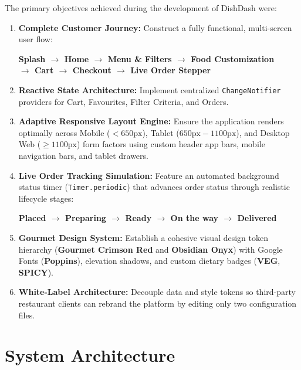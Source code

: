\documentclass[11pt,a4paper]{article}
\begin{document}
The primary objectives achieved during the development of DishDash were:
\begin{enumerate}[leftmargin=*]
    \item \textbf{Complete Customer Journey:} Construct a fully functional, multi-screen user flow: 
    \begin{center}
    \small\bfseries
    Splash $\longrightarrow$ Home $\longrightarrow$ Menu \& Filters $\longrightarrow$ Food Customization \\
    $\longrightarrow$ Cart $\longrightarrow$ Checkout $\longrightarrow$ Live Order Stepper
    \end{center}
    \item \textbf{Reactive State Architecture:} Implement centralized \texttt{ChangeNotifier} providers for Cart, Favourites, Filter Criteria, and Orders.
    \item \textbf{Adaptive Responsive Layout Engine:} Ensure the application renders optimally across Mobile ($<650\text{px}$), Tablet ($650\text{px} - 1100\text{px}$), and Desktop Web ($\ge 1100\text{px}$) form factors using custom header app bars, mobile navigation bars, and tablet drawers.
    \item \textbf{Live Order Tracking Simulation:} Feature an automated background status timer (\texttt{Timer.periodic}) that advances order status through realistic lifecycle stages:
    \begin{center}
    \small\bfseries
    Placed $\longrightarrow$ Preparing $\longrightarrow$ Ready $\longrightarrow$ On the way $\longrightarrow$ Delivered
    \end{center}
    \item \textbf{Gourmet Design System:} Establish a cohesive visual design token hierarchy (\textbf{Gourmet Crimson Red} and \textbf{Obsidian Onyx}) with Google Fonts (\textbf{Poppins}), elevation shadows, and custom dietary badges (\textbf{VEG}, \textbf{SPICY}).
    \item \textbf{White-Label Architecture:} Decouple data and style tokens so third-party restaurant clients can rebrand the platform by editing only two configuration files.
\end{enumerate}

\FloatBarrier

\section{System Architecture}
\end{document}
